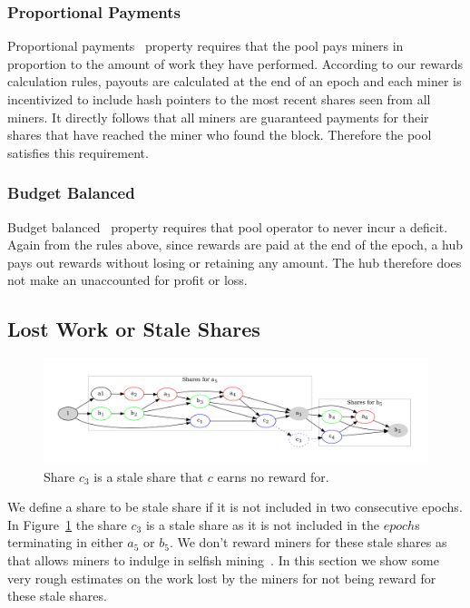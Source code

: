 \documentclass{article}
\begin{document}
\subsubsection{Proportional Payments}\label{sec:proportional-payments}

Proportional payments~\cite{incentives-compatible} property requires
that the pool pays miners in proportion to the amount of work they
have performed. According to our rewards calculation rules, payouts
are calculated at the end of an epoch and each miner is incentivized
to include hash pointers to the most recent shares seen from all
miners. It directly follows that all miners are guaranteed payments
for their shares that have reached the miner who found the
block. Therefore the pool satisfies this requirement.

\subsubsection{Budget Balanced}\label{sec:budget-balanced}

Budget balanced~\cite{incentives-compatible} property requires that
pool operator to never incur a deficit. Again from the rules above,
since rewards are paid at the end of the epoch, a hub pays out rewards
without losing or retaining any amount. The hub therefore does not
make an unaccounted for profit or loss.

\subsection{Lost Work or Stale Shares}\label{ref:stales}

\begin{figure}
  \begin{center}
    \includegraphics[width=1\textwidth]{shares-propagation.pdf}
    \caption{Share $c_3$ is a stale share that $c$ earns no reward
      for.}\label{fig:shares-propagation}
  \end{center}
\end{figure}

We define a share to be stale share if it is not included in two
consecutive epochs. In Figure~\ref{fig:shares-propagation} the share
$c_3$ is a stale share as it is not included in the $epoch$s
terminating in either $a_5$ or $b_5$. We don't reward miners for these
stale shares as that allows miners to indulge in selfish
mining~\cite{majority-is-not-enough}. In this section we show some
very rough estimates on the work lost by the miners for not being
reward for these stale shares.
\end{document}
